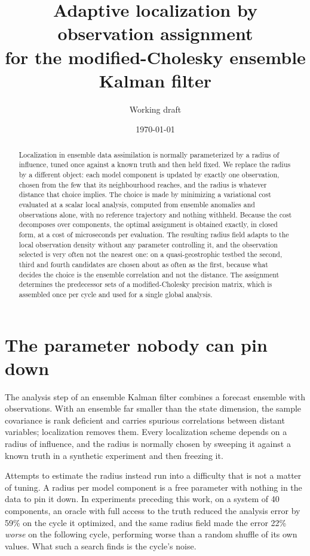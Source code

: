 \documentclass[11pt,a4paper]{article}
\title{\textbf{Adaptive localization by observation assignment\\
for the modified-Cholesky ensemble Kalman filter}}
\author{Working draft}
\date{\today}
\begin{document}
\maketitle

\begin{abstract}
\noindent
Localization in ensemble data assimilation is normally parameterized by a
radius of influence, tuned once against a known truth and then held fixed. We
replace the radius by a different object: each model component is updated by
exactly one observation, chosen from the few that its neighbourhood reaches,
and the radius is whatever distance that choice implies. The choice is made by
minimizing a variational cost evaluated at a scalar local analysis, computed
from ensemble anomalies and observations alone, with no reference trajectory
and nothing withheld. Because the cost decomposes over components, the optimal
assignment is obtained exactly, in closed form, at a cost of microseconds per
evaluation. The resulting radius field adapts to the local observation density
without any parameter controlling it, and the observation selected is very
often not the nearest one: on a quasi-geostrophic testbed the second, third and
fourth candidates are chosen about as often as the first, because what decides
the choice is the ensemble correlation and not the distance. The assignment
determines the predecessor sets of a modified-Cholesky precision matrix, which
is assembled once per cycle and used for a single global analysis.
\end{abstract}

\section{The parameter nobody can pin down}

The analysis step of an ensemble Kalman filter combines a forecast ensemble
with observations. With an ensemble far smaller than the state dimension, the
sample covariance is rank deficient and carries spurious correlations between
distant variables; localization removes them. Every localization scheme depends
on a radius of influence, and the radius is normally chosen by sweeping it
against a known truth in a synthetic experiment and then freezing it.

Attempts to estimate the radius instead run into a difficulty that is not a
matter of tuning. A radius per model component is a free parameter with nothing
in the data to pin it down. In experiments preceding this work, on a system of
40 components, an oracle with full access to the truth reduced the analysis
error by 59\% on the cycle it optimized, and the same radius field made the
error 22\% \emph{worse} on the following cycle, performing worse than a random
shuffle of its own values. What such a search finds is the cycle's noise.
\end{document}
